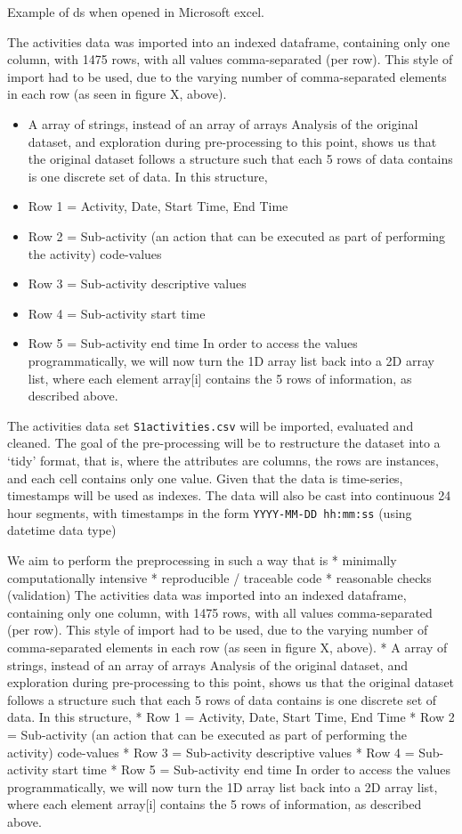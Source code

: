 \documentclass[reprint, floatfix, groupaddress, prb]{revtex4-1}
\providecommand{\tightlist}{%
      \setlength{\itemsep}{0pt}\setlength{\parskip}{0pt}}
\begin{document}
Example of ds when opened in Microsoft excel.

The activities data was imported into an indexed dataframe, containing
only one column, with 1475 rows, with all values comma-separated (per
row). This style of import had to be used, due to the varying number of
comma-separated elements in each row (as seen in figure X, above).

\begin{itemize}
\tightlist
\item
  A array of strings, instead of an array of arrays Analysis of the
  original dataset, and exploration during pre-processing to this point,
  shows us that the original dataset follows a structure such that each
  5 rows of data contains is one discrete set of data. In this
  structure,
\item
  Row 1 = Activity, Date, Start Time, End Time
\item
  Row 2 = Sub-activity (an action that can be executed as part of
  performing the activity) code-values
\item
  Row 3 = Sub-activity descriptive values
\item
  Row 4 = Sub-activity start time
\item
  Row 5 = Sub-activity end time In order to access the values
  programmatically, we will now turn the 1D array list back into a 2D
  array list, where each element array{[}i{]} contains the 5 rows of
  information, as described above.
\end{itemize}

The activities data set \texttt{S1activities.csv} will be imported,
evaluated and cleaned. The goal of the pre-processing will be to
restructure the dataset into a `tidy' format, that is, where the
attributes are columns, the rows are instances, and each cell contains
only one value. Given that the data is time-series, timestamps will be
used as indexes. The data will also be cast into continuous 24 hour
segments, with timestamps in the form \texttt{YYYY-MM-DD\ hh:mm:ss}
(using datetime data type)

We aim to perform the preprocessing in such a way that is * minimally
computationally intensive * reproducible / traceable code * reasonable
checks (validation) The activities data was imported into an indexed
dataframe, containing only one column, with 1475 rows, with all values
comma-separated (per row). This style of import had to be used, due to
the varying number of comma-separated elements in each row (as seen in
figure X, above). * A array of strings, instead of an array of arrays
Analysis of the original dataset, and exploration during pre-processing
to this point, shows us that the original dataset follows a structure
such that each 5 rows of data contains is one discrete set of data. In
this structure, * Row 1 = Activity, Date, Start Time, End Time * Row 2 =
Sub-activity (an action that can be executed as part of performing the
activity) code-values * Row 3 = Sub-activity descriptive values * Row 4
= Sub-activity start time * Row 5 = Sub-activity end time In order to
access the values programmatically, we will now turn the 1D array list
back into a 2D array list, where each element array{[}i{]} contains the
5 rows of information, as described above.
\end{document}
